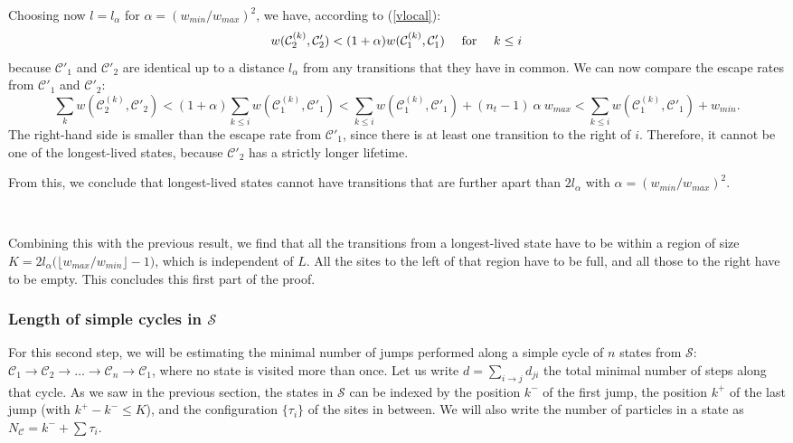 \documentclass[aps,pre,onecolumn,showpacs,showkeys,a4paper]{revtex4-1}
\begin{document}
Choosing now $l=l_\alpha$ for $\alpha=(w_{min}/w_{max})^2$, we have, according to (\ref{vlocal}):
\begin{equation}
w(\mathcal{C}_2^{(k)},\mathcal{C}'_2)<(1+\alpha)w(\mathcal{C}_1^{(k)},\mathcal{C}'_1)~~~~{\rm for}~~~~k\leq i
\end{equation}
because $\mathcal{C}'_1$ and $\mathcal{C}'_2$ are identical up to a distance $l_\alpha$ from any transitions that they have in common. We can now compare the escape rates from $\mathcal{C}'_1$ and $\mathcal{C}'_2$:
\begin{equation}
\sum\limits_k w(\mathcal{C}_2^{(k)},\mathcal{C}'_2)<(1+\alpha)\sum\limits_{k\leq i} w(\mathcal{C}_1^{(k)},\mathcal{C}'_1)<\sum\limits_{k\leq i} w(\mathcal{C}_1^{(k)},\mathcal{C}'_1)+(n_t-1)~\alpha~ w_{max}<\sum\limits_{k\leq i} w(\mathcal{C}_1^{(k)},\mathcal{C}'_1)+w_{min}.
\end{equation}
The right-hand side is smaller than the escape rate from $\mathcal{C}'_1$, since there is at least one transition to the right of $i$. Therefore, it cannot be one of the longest-lived states, because $\mathcal{C}'_2$ has a strictly longer lifetime.

From this, we conclude that longest-lived states cannot have transitions that are further apart than $2 l_\alpha$ with $\alpha=(w_{min}/w_{max})^2$.

~~

Combining this with the previous result, we find that all the transitions from a longest-lived state have to be within a region of size $K=2 l_\alpha \bigl(\bigl\lfloor w_{max}/w_{min}\bigr\rfloor-1\bigr)$, which is independent of $L$. All the sites to the left of that region have to be full, and all those to the right have to be empty. This concludes this first part of the proof.


\subsubsection{Length of simple cycles in $\mathcal{S}$}
\label{IVc2}

For this second step, we will be estimating the minimal number of jumps performed along a simple cycle of $n$ states from $\mathcal{S}$: $\mathcal{C}_1\rightarrow\mathcal{C}_2\rightarrow\dots\rightarrow\mathcal{C}_n\rightarrow\mathcal{C}_1$, where no state is visited more than once. Let us write $d=\sum\limits_{i\rightarrow j} d_{ji}$ the total minimal number of steps along that cycle. As we saw in the previous section, the states in $\mathcal{S}$ can be indexed by the position $k^-$ of the first jump, the position $k^+$ of the last jump (with $k^+-k^-\leq K$), and the configuration $\{\tau_i\}$ of the sites in between. We will also write the number of particles in a state as $N_{\mathcal{C}}=k^-+\sum\tau_i$.
\end{document}
